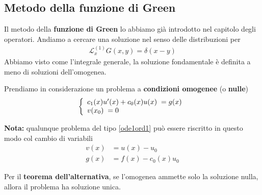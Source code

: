 \subsection{Metodo della funzione di Green} 
Il metodo della \textbf{funzione di Green} lo abbiamo già introdotto nel capitolo degli operatori. Andiamo a cercare una soluzione nel senso delle distribuzioni per
	\begin{align}
		\mathcal{L}^{(1)}_x G(x,y) = \delta(x-y) \label{green1}
	\end{align}
Abbiamo visto come l'integrale generale, la soluzione fondamentale è definita a meno di soluzioni dell'omogenea. 

Prendiamo in considerazione un problema a \textbf{condizioni omogenee} (o \textbf{nulle})
\begin{align}
	\left\{\begin{array}{c}
		c_1 (x) u'(x) + c_0(x) u(x) \; = g(x) \hfill \\
		v(x_0) \;  = 0 \hfill 
	\end{array}
	\right.
\end{align}

\textbf{Nota:} qualunque problema del tipo \ref{ode1ord1} può essere riscritto in questo modo col cambio di variabili
\begin{align}
	v(x) &= u(x) - u_0\\
	g(x) &= f(x) - c_0(x)u_0
\end{align}

Per il \textbf{teorema dell'alternativa}, se l'omogenea ammette solo la soluzione nulla, allora il problema ha soluzione unica.

